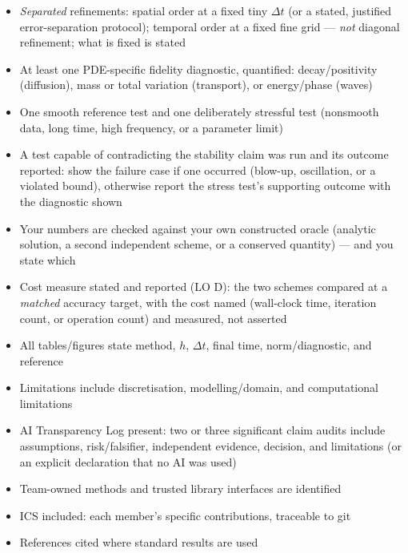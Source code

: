 \documentclass[11pt]{article}
\begin{document}
\begin{itemize}[leftmargin=2.4em, itemsep=1pt]
    $L_h$ symmetric negative semidefinite); only then has the scheme no
    stability boundary to cross; a conservation-law project checks the
    entropy condition instead --- the checklist item is conditional on
    the pathway, not universal
  \item[$\square$] \emph{Separated} refinements: spatial order at a fixed tiny
    $\Delta t$ (or a stated, justified error-separation protocol); temporal
    order at a fixed fine grid --- \emph{not} diagonal refinement; what is
    fixed is stated
  \item[$\square$] At least one PDE-specific fidelity diagnostic, quantified:
    decay/positivity (diffusion), mass or total variation (transport), or
    energy/phase (waves)
  \item[$\square$] One smooth reference test and one deliberately stressful
    test (nonsmooth data, long time, high frequency, or a parameter limit)
  \item[$\square$] A test capable of contradicting the stability claim was
    run and its outcome reported: show the failure case if one occurred
    (blow-up, oscillation, or a violated bound), otherwise report the
    stress test's supporting outcome with the diagnostic shown
  \item[$\square$] Your numbers are checked against your own constructed oracle
    (analytic solution, a second independent scheme, or a conserved quantity)
    --- and you state which
  \item[$\square$] Cost measure stated and reported (LO D): the two schemes
    compared at a \emph{matched} accuracy target, with the cost named (wall-clock
    time, iteration count, or operation count) and measured, not asserted
  \item[$\square$] All tables/figures state method, $h$, $\Delta t$, final
    time, norm/diagnostic, and reference
  \item[$\square$] Limitations include discretisation, modelling/domain, and
    computational limitations
  \item[$\square$] AI Transparency Log present: two or three significant claim
    audits include assumptions, risk/falsifier, independent evidence, decision,
    and limitations (or an explicit declaration that no AI was used)
  \item[$\square$] Team-owned methods and trusted library interfaces are identified
  \item[$\square$] ICS included: each member's specific contributions, traceable to git
  \item[$\square$] References cited where standard results are used
\end{itemize}
\end{document}
